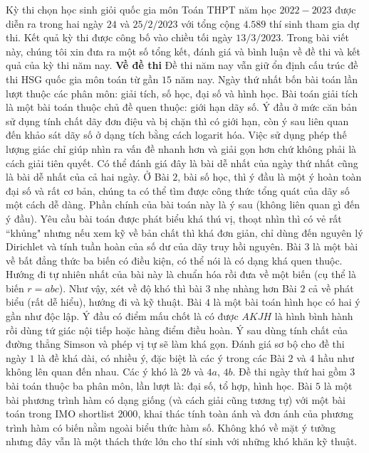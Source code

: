 \begin{multicols}{2}
	Kỳ thi chọn học sinh giỏi quốc gia môn Toán THPT năm học $2022-2023$ được diễn ra trong hai ngày $24$ và $25/2/2023$ với tổng cộng $4{.}589$ thí sinh tham gia dự thi. Kết quả kỳ thi được công bố vào chiều tối ngày $13/3/2023$. Trong bài viết này, chúng tôi xin đưa ra một số tổng kết, đánh giá và bình luận về đề thi và kết quả của kỳ thi năm nay.
	\vskip 0.05cm
	\textbf{\color{cackithi}Về đề thi}
	\vskip 0.05cm
	Đề thi năm nay vẫn giữ ổn định cấu trúc đề thi HSG quốc gia môn toán từ gần $15$ năm nay.
	Ngày thứ nhất bốn bài toán lần lượt thuộc các phân môn: giải tích, số học, đại số và hình học. Bài toán giải tích là một bài toán thuộc chủ đề quen thuộc: giới hạn dãy số. Ý đầu ở mức căn bản sử dụng tính chất dãy đơn điệu và bị chặn thì có giới hạn, còn ý sau liên quan đến khảo sát dãy số ở dạng tích bằng cách logarit hóa. Việc sử dụng phép thế lượng giác chỉ giúp nhìn ra vấn đề nhanh hơn và giải gọn hơn chứ không phải là cách giải tiên quyết. Có thể đánh giá đây là bài dễ nhất của ngày thứ nhất cũng là bài dễ nhất của cả hai ngày. 
	\vskip 0.05cm
	Ở Bài $2$, bài số học, thì ý đầu là một ý hoàn toàn đại số và rất cơ bản, chúng ta có thể tìm được công thức tổng quát của dãy số một cách dễ dàng. Phần chính của bài toán này là ý sau (không liên quan gì đến ý đầu). Yêu cầu bài toán được phát biểu khá thú vị, thoạt nhìn thì có vẻ rất ``khủng" nhưng nếu xem kỹ về bản chất thì khá đơn giản, chỉ dùng đến nguyên lý Dirichlet và tính tuần hoàn của số dư của dãy truy hồi nguyên. 
	\vskip 0.05cm
	Bài $3$ là một bài về bất đẳng thức ba biến có điều kiện, có thể nói là có dạng khá quen thuộc. Hướng đi tự nhiên nhất của bài này là chuẩn hóa rồi đưa về một biến (cụ thể là biến $r = abc$). Như vậy, xét về độ khó thì bài $3$ nhẹ nhàng hơn Bài $2$ cả về phát biểu (rất dễ hiểu), hướng đi và kỹ thuật.  
	\vskip 0.05cm
	Bài $4$ là một bài toán hình học có hai ý gần như độc lập. Ý đầu có điểm mấu chốt là có được $AKJH$ là hình bình hành rồi dùng tứ giác nội tiếp hoặc hàng điểm điều hoàn. Ý sau dùng tính chất của đường thẳng Simson và phép vị tự sẽ làm khá gọn. 
	\vskip 0.05cm
	Đánh giá sơ bộ cho đề thi ngày $1$ là đề khá dài, có nhiều ý, đặc biệt là các ý trong các Bài $2$ và $4$ hầu như không lên quan đến nhau. Các ý khó là $2b$ và $4a$, $4b$.
	\vskip 0.05cm 
	Đề thi ngày thứ hai gồm $3$ bài toán thuộc ba phân môn, lần lượt là: đại số, tổ hợp, hình học.
	\vskip 0.05cm
	Bài $5$ là một bài phương trình hàm có dạng giống (và cách giải cũng tương tự) với một bài toán trong IMO shortlist $2000$, khai thác tính toàn ánh và đơn ánh của phương trình hàm có biến nằm ngoài biểu thức hàm số. Không khó về mặt ý tưởng nhưng đây vẫn là một thách thức lớn cho thí sinh với những khó khăn kỹ thuật.   

\end{multicols}
